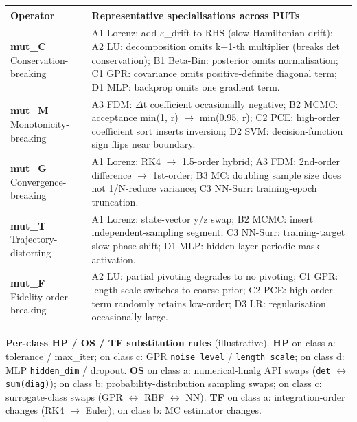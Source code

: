 \documentclass[review,12pt,authoryear]{elsarticle}
\newcounter{none}                   %
\begin{document}
{\def\LTcaptype{none} %
\begin{longtable}[]{@{}
  >{\raggedright\arraybackslash}p{}
  >{\raggedright\arraybackslash}p{}@{}}
\toprule\noalign{}
\begin{minipage}[b]{\linewidth}\raggedright
Operator
\end{minipage} & \begin{minipage}[b]{\linewidth}\raggedright
Representative specialisations across PUTs
\end{minipage} \\
\midrule\noalign{}
\endhead
\bottomrule\noalign{}
\endlastfoot
\textbf{mut\_C} Conservation-breaking & A1 Lorenz: add $\varepsilon$\_drift to RHS
(slow Hamiltonian drift); A2 LU: decomposition omits k+1-th multiplier
(breaks det conservation); B1 Beta-Bin: posterior omits normalisation;
C1 GPR: covariance omits positive-definite diagonal term; D1 MLP:
backprop omits one gradient term. \\
\textbf{mut\_M} Monotonicity-breaking & A3 FDM: $\Delta$t coefficient
occasionally negative; B2 MCMC: acceptance min(1, r) $\to$ min(0.95, r); C2
PCE: high-order coefficient sort inserts inversion; D2 SVM:
decision-function sign flips near boundary. \\
\textbf{mut\_G} Convergence-breaking & A1 Lorenz: RK4 $\to$ 1.5-order
hybrid; A3 FDM: 2nd-order difference $\to$ 1st-order; B3 MC: doubling sample
size does not 1/N-reduce variance; C3 NN-Surr: training-epoch
truncation. \\
\textbf{mut\_T} Trajectory-distorting & A1 Lorenz: state-vector y/z
swap; B2 MCMC: insert independent-sampling segment; C3 NN-Surr:
training-target slow phase shift; D1 MLP: hidden-layer periodic-mask
activation. \\
\textbf{mut\_F} Fidelity-order-breaking & A2 LU: partial pivoting
degrades to no pivoting; C1 GPR: length-scale switches to coarse prior;
C2 PCE: high-order term randomly retains low-order; D3 LR:
regularisation occasionally large. \\
\end{longtable}
}

\textbf{Per-class HP / OS / TF substitution rules} (illustrative).
\textbf{HP} on class a: tolerance / max\_iter; on class c: GPR
\texttt{noise\_level} / \texttt{length\_scale}; on class d: MLP
\texttt{hidden\_dim} / dropout. \textbf{OS} on class a: numerical-linalg
API swaps (\texttt{det} $\leftrightarrow$ \texttt{sum(diag)}); on class b:
probability-distribution sampling swaps; on class c: surrogate-class
swaps (GPR $\leftrightarrow$ RBF $\leftrightarrow$ NN). \textbf{TF} on class a: integration-order
changes (RK4 $\to$ Euler); on class b: MC estimator changes.
\end{document}
